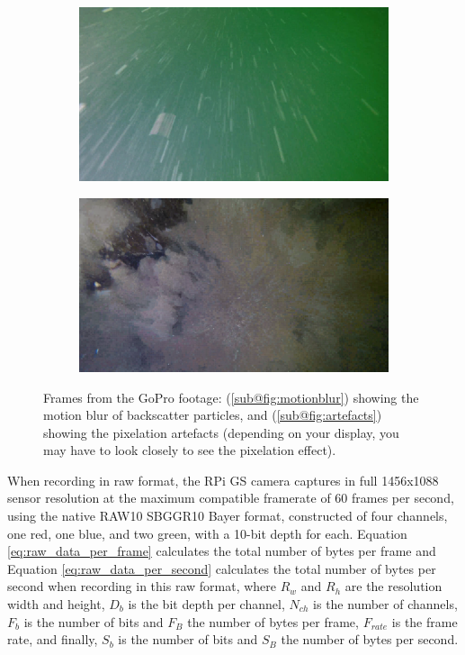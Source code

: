 \begin{figure}[H]
    \centering
    \begin{subfigure}{.49\textwidth}
        \centering
        \includegraphics[width=1\linewidth]{assets/gopro_footage_streaks.jpg}
        \caption{}
        \label{fig:motionblur}
    \end{subfigure}
    \hfill
    \begin{subfigure}{.49\textwidth}
        \centering
        \includegraphics[width=1\linewidth]{assets/gopro_footage_artefacts.png}
        \caption{}
        \label{fig:artefacts}
    \end{subfigure}
    \caption{Frames from the GoPro footage: (\ref{sub@fig:motionblur}) showing the motion blur of backscatter particles, and (\ref{sub@fig:artefacts}) showing the pixelation artefacts (depending on your display, you may have to look closely to see the pixelation effect).}
    \label{fig:gopro}
\end{figure}

When recording in raw format, the RPi GS camera captures in full 1456x1088 sensor resolution at the maximum compatible framerate of 60 frames per second, using the native RAW10 SBGGR10 Bayer format, constructed of four channels, one red, one blue, and two green, with a 10-bit depth for each. Equation \ref{eq:raw_data_per_frame} calculates the total number of bytes per frame and Equation \ref{eq:raw_data_per_second} calculates the total number of bytes per second when recording in this raw format, where $R_w$ and $R_h$ are the resolution width and height, $D_b$ is the bit depth per channel, $N_{ch}$ is the number of channels, $F_b$ is the number of bits and $F_B$ the number of bytes per frame, $F_{rate}$ is the frame rate, and finally, $S_b$ is the number of bits and $S_B$ the number of bytes per second.

